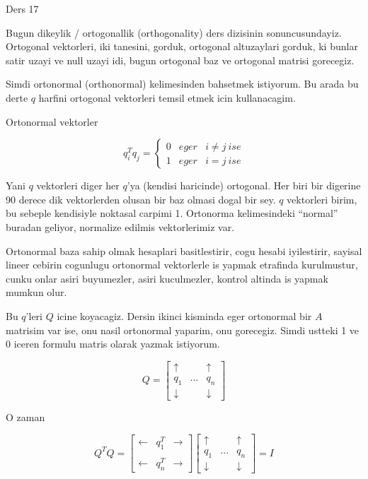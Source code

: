 \documentclass[12pt,fleqn]{article}\usepackage{../common}
\begin{document}
Ders 17

Bugun dikeylik / ortogonallik (orthogonality) ders dizisinin
sonuncusundayiz. Ortogonal vektorleri, iki tanesini, gorduk, ortogonal
altuzaylari gorduk, ki bunlar satir uzayi ve null uzayi idi, bugun
ortogonal baz ve ortogonal matrisi gorecegiz. 

Simdi ortonormal (orthonormal) kelimesinden bahsetmek istiyorum. Bu arada
bu derte $q$ harfini ortogonal vektorleri temsil etmek icin kullanacagim. 

Ortonormal vektorler 

\[ 
q_i^Tq_j = \left\{ \begin{array}{lll}
0 & eger & i \ne j \ ise\\
1 & eger & i = j \ ise
\end{array} \right.
 \]

Yani $q$ vektorleri diger her $q$'ya (kendisi haricinde) ortogonal. Her
biri bir digerine 90 derece dik vektorlerden olusan bir baz olmasi dogal
bir sey. $q$ vektorleri birim, bu sebeple kendisiyle noktasal carpimi
1. Ortonorma kelimesindeki ``normal'' buradan geliyor, normalize edilmis
vektorlerimiz var. 

Ortonormal baza sahip olmak hesaplari basitlestirir, cogu hesabi
iyilestirir, sayisal lineer cebirin cogunlugu ortonormal vektorlerle is
yapmak etrafinda kurulmustur, cunku onlar asiri buyumezler, asiri
kuculmezler, kontrol altinda is yapmak mumkun olur. 

Bu $q$'leri $Q$ icine koyacagiz. Dersin ikinci kisminda eger ortonormal bir
$A$ matrisim var ise, onu nasil ortonormal yaparim, onu gorecegiz. Simdi
ustteki 1 ve 0 iceren formulu matris olarak yazmak istiyorum. 

\[ 
Q = 
\left[\begin{array}{rrr}
\uparrow &  & \uparrow \\
q_1 & ... &  q_n \\
\downarrow &  & \downarrow 
\end{array}\right]
 \]

O zaman 

\[ 
Q^TQ = 
\left[\begin{array}{rrr}
\leftarrow & q_1^T & \rightarrow \\
& &  \\
\leftarrow & q_n^T & \rightarrow 
\end{array}\right]
\left[\begin{array}{rrr}
\uparrow &  & \uparrow \\
q_1 & ... &  q_n \\
\downarrow &  & \downarrow 
\end{array}\right] = 
I
 \]
\end{document}
